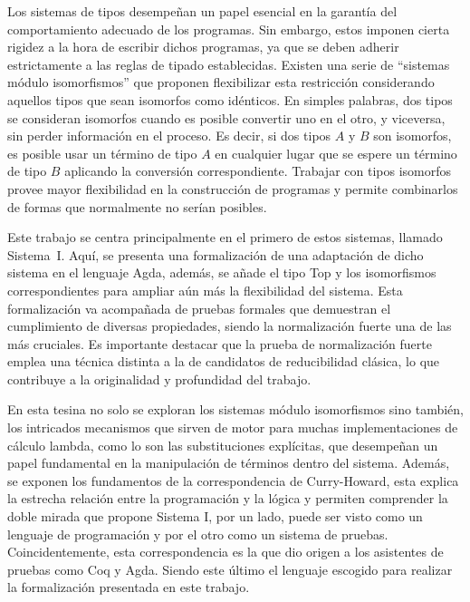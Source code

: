 Los sistemas de tipos desempeñan un papel esencial en la garantía del comportamiento adecuado de los programas.
Sin embargo, estos imponen cierta rigidez a la hora de escribir dichos programas, ya que se deben adherir estrictamente a las reglas de tipado establecidas.
Existen una serie de ``sistemas módulo isomorfismos'' \cite{system-i,lambda-plus,sip} que proponen flexibilizar esta restricción considerando aquellos tipos que sean isomorfos como idénticos.
En simples palabras, dos tipos se consideran isomorfos cuando es posible convertir uno en el otro, y viceversa, sin perder información en el proceso.
Es decir, si dos tipos $A$ y $B$ son isomorfos, es posible usar un término de tipo $A$ en cualquier lugar que se espere un término de tipo $B$ aplicando la conversión correspondiente.
Trabajar con tipos isomorfos provee mayor flexibilidad en la construcción de programas y permite combinarlos de formas que normalmente no serían posibles.

Este trabajo se centra principalmente en el primero de estos sistemas, llamado Sistema~I.
Aquí, se presenta una formalización de una adaptación de dicho sistema en el lenguaje Agda, además, se añade el tipo Top y los isomorfismos correspondientes para ampliar aún más la flexibilidad del sistema.
Esta formalización va acompañada de pruebas formales que demuestran el cumplimiento de diversas propiedades, siendo la normalización fuerte una de las más cruciales.
Es importante destacar que la prueba de normalización fuerte emplea una técnica distinta a la de candidatos de reducibilidad clásica, lo que contribuye a la originalidad y profundidad del trabajo.

En esta tesina no solo se exploran los sistemas módulo isomorfismos sino también, los intricados mecanismos que sirven de motor para muchas implementaciones de cálculo lambda, como lo son las substituciones explícitas, que desempeñan un papel fundamental en la manipulación de términos dentro del sistema.
Además, se exponen los fundamentos de la correspondencia de Curry-Howard, esta explica la estrecha relación entre la programación y la lógica y permiten comprender la doble mirada que propone Sistema I, por un lado, puede ser visto como un lenguaje de programación y por el otro como un sistema de pruebas.
Coincidentemente, esta correspondencia es la que dio origen a los asistentes de pruebas como Coq y Agda.
Siendo este último el lenguaje escogido para realizar la formalización presentada en este trabajo.